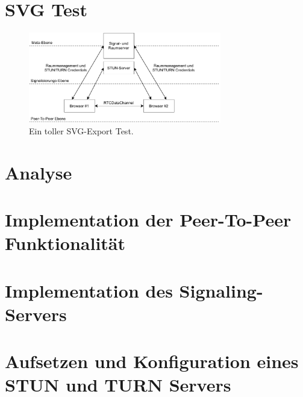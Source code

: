 \section{SVG Test}
\begin{figure}[h]
\centering
\includegraphics[width=0.75\textwidth]{bilder/test_svg_pdf.pdf}
\caption{Ein toller SVG-Export Test.}
\end{figure}

\section{Analyse}

\section{Implementation der Peer-To-Peer Funktionalität}

\section{Implementation des Signaling-Servers}

\section{Aufsetzen und Konfiguration eines STUN und TURN Servers}